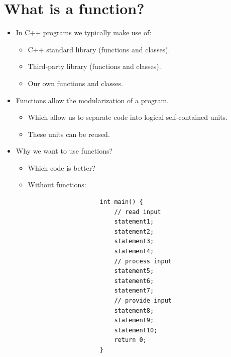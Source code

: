 \section{What is a function?}
\begin{itemize}
    \item In C++ programs we typically make use of:
        \begin{itemize}
            \item C++ standard library (functions and classes).
            \item Third-party library (functions and classes).
            \item Our own functions and classes.
        \end{itemize}
    
    \item Functions allow the modularization of a program.
        \begin{itemize}
            \item Which allow us to separate code into logical self-contained units.
            \item These units can be reused.
        \end{itemize}
    
    \item Why we want to use functions?
        \begin{itemize}
            \item Which code is better?
        \end{itemize}
        \begin{itemize}
            \item Without functions:
                \begin{verbatim}
                    int main() {
                        // read input
                        statement1;
                        statement2;
                        statement3;
                        statement4;
                        // process input
                        statement5;
                        statement6;
                        statement7;
                        // provide input
                        statement8;
                        statement9;
                        statement10;
                        return 0;
                    }
                \end{verbatim}
            

\end{itemize}
\end{itemize}
